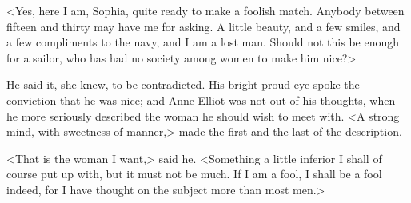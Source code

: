 <Yes, here I am, Sophia, quite ready to make a foolish match. Anybody between fifteen and thirty may have me for asking. A little beauty, and a few smiles, and a few compliments to the navy, and I am a lost man. Should not this be enough for a sailor, who has had no society among women to make him nice?>

He said it, she knew, to be contradicted. His bright proud eye spoke the conviction that he was nice; and Anne Elliot was not out of his thoughts, when he more seriously described the woman he should wish to meet with. <A strong mind, with sweetness of manner,> made the first and the last of the description.

<That is the woman I want,> said he. <Something a little inferior I shall of course put up with, but it must not be much. If I am a fool, I shall be a fool indeed, for I have thought on the subject more than most men.>